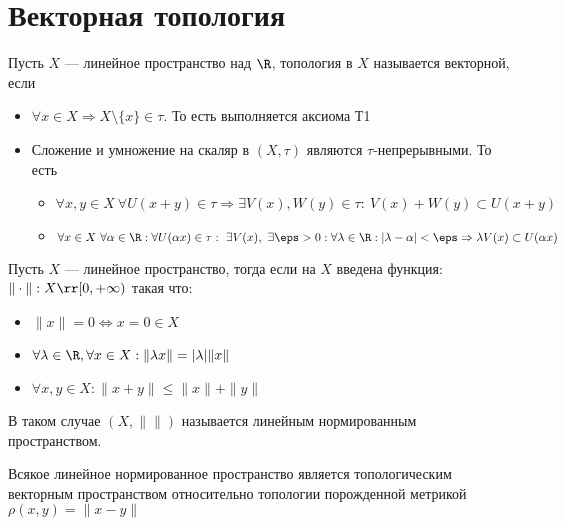\newpage
\section{Векторная топология}

\begin{definition}
	Пусть $X$ --- линейное пространство над $\R$, топология в $X$ называется векторной, если
	\begin{itemize}
		\item $\forall x \in X \Rightarrow X \setminus \{x\} \in \tau$. То есть выполняется аксиома Т1
		\item Сложение и умножение на скаляр в $(X, \tau)$ являются $\tau$-непрерывными. То есть
		\begin{itemize}
			\item $\forall x,y \in X \ \forall U(x + y) \in \tau \Rightarrow \exists V(x), W(y) \in \tau: \ V(x) + W(y) \subset U(x + y)$
			\item $\forall x \in X \ \forall \alpha \in \R:  \forall U(\alpha x) \in \tau: \ \exists V(x), \ \exists \eps > 0: \forall \lambda \in \R : |\lambda - \alpha| < \eps \Rightarrow \lambda V(x) \subset U(\alpha x )$
		\end{itemize}
	\end{itemize}
\end{definition}
\begin{definition}
	Пусть $X$ --- линейное пространство, тогда если на $X$ введена функция: $\|\cdot\|: X \rr [0, +\infty)$ такая что:
	\begin{itemize}
		\item $\|x\| = 0 \Leftrightarrow x = 0 \in X$ 
		\item $\forall \lambda \in \R, \forall x \in X: \|\lambda x \| = |\lambda| \|x\| $
		\item $\forall x,y \in X: \|x + y\| \leq \|x\| + \|y\|$
	\end{itemize} 
	В таком случае $(X, \|\|)$ называется линейным нормированным пространством.
\end{definition}
\begin{claim}
	Всякое линейное нормированное пространство является топологическим векторным пространством относительно топологии порожденной метрикой $\rho(x,y) = \|x - y \|$
\end{claim}
